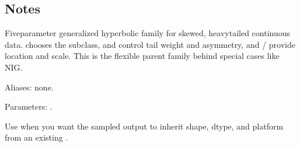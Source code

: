 \documentclass[letterpaper,10pt,english]{sphinxmanual}
\begin{document}
\subsection{Notes}
\label{\detokenize{distribution_catalog:id155}}
\sphinxAtStartPar
Five\sphinxhyphen{}parameter generalized hyperbolic family for skewed, heavy\sphinxhyphen{}tailed continuous data.  chooses the subclass,  and  control tail weight and asymmetry, and  /  provide location and scale. This is the flexible parent family behind special cases like NIG.

\sphinxAtStartPar
Aliases: none.

\sphinxAtStartPar
Parameters: .

\sphinxAtStartPar
Use  when you want the sampled output to inherit shape, dtype, and platform from an existing .
\end{document}
